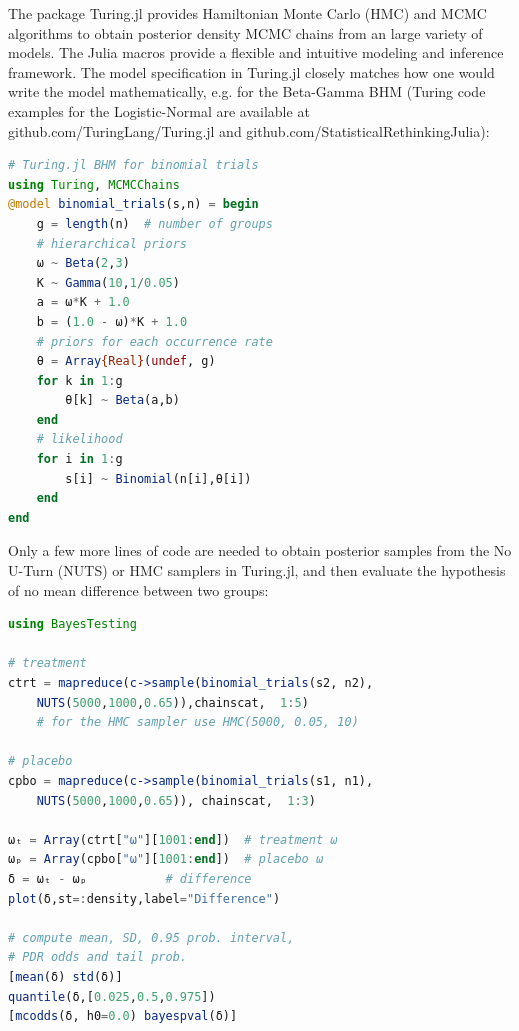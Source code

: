 \documentclass{juliacon}
\begin{document}
\vskip 6pt
The package Turing.jl provides Hamiltonian Monte Carlo (HMC) and MCMC algorithms to obtain posterior density MCMC chains from an large variety of models. The Julia macros provide a flexible and intuitive modeling and inference framework. The model specification in Turing.jl closely matches how one would write the model mathematically, e.g. for the Beta-Gamma BHM (Turing code examples for the Logistic-Normal are available at github.com/TuringLang/Turing.jl and github.com/StatisticalRethinkingJulia):
\begin{lstlisting}[language = Julia]
# Turing.jl BHM for binomial trials
using Turing, MCMCChains
@model binomial_trials(s,n) = begin
	g = length(n)  # number of groups
	# hierarchical priors
	ω ~ Beta(2,3)
	K ~ Gamma(10,1/0.05)
	a = ω*K + 1.0
	b = (1.0 - ω)*K + 1.0
	# priors for each occurrence rate
	θ = Array{Real}(undef, g)
	for k in 1:g
		θ[k] ~ Beta(a,b)
	end
	# likelihood
	for i in 1:g
		s[i] ~ Binomial(n[i],θ[i])
	end
end
\end{lstlisting}

Only a few more lines of code are needed to obtain posterior samples from the No U-Turn (NUTS) or HMC samplers in Turing.jl, and then evaluate the hypothesis of no mean difference between two groups:
\begin{lstlisting}[language = Julia]
using BayesTesting

# treatment
ctrt = mapreduce(c->sample(binomial_trials(s2, n2),
	NUTS(5000,1000,0.65)),chainscat,  1:5)
	# for the HMC sampler use HMC(5000, 0.05, 10)

# placebo
cpbo = mapreduce(c->sample(binomial_trials(s1, n1),
	NUTS(5000,1000,0.65)), chainscat,  1:3)

ωₜ = Array(ctrt["ω"][1001:end])  # treatment ω
ωₚ = Array(cpbo["ω"][1001:end])  # placebo ω
δ = ωₜ - ωₚ           # difference
plot(δ,st=:density,label="Difference")

# compute mean, SD, 0.95 prob. interval,
# PDR odds and tail prob.
[mean(δ) std(δ)]
quantile(δ,[0.025,0.5,0.975])
[mcodds(δ, h0=0.0) bayespval(δ)]
\end{lstlisting}
\end{document}
